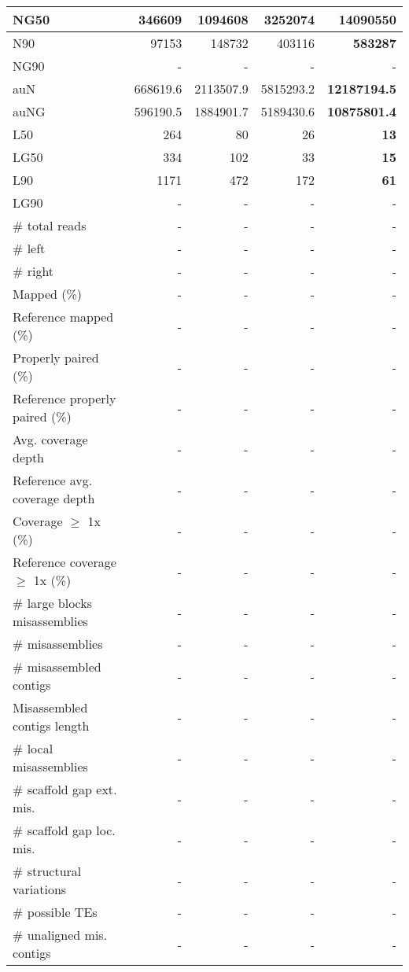 \documentclass[12pt,a4paper]{article}
\begin{document}
\begin{table}[ht]
\begin{center}
\begin{tabular}{|l*{4}{|r}|}
NG50 & 346609 & 1094608 & 3252074 & {\bf 14090550} \\ \hline
N90 & 97153 & 148732 & 403116 & {\bf 583287} \\ \hline
NG90 & - & - & - & - \\ \hline
auN & 668619.6 & 2113507.9 & 5815293.2 & {\bf 12187194.5} \\ \hline
auNG & 596190.5 & 1884901.7 & 5189430.6 & {\bf 10875801.4} \\ \hline
L50 & 264 & 80 & 26 & {\bf 13} \\ \hline
LG50 & 334 & 102 & 33 & {\bf 15} \\ \hline
L90 & 1171 & 472 & 172 & {\bf 61} \\ \hline
LG90 & - & - & - & - \\ \hline
\# total reads & - & - & - & - \\ \hline
\# left & - & - & - & - \\ \hline
\# right & - & - & - & - \\ \hline
Mapped (\%) & - & - & - & - \\ \hline
Reference mapped (\%) & - & - & - & - \\ \hline
Properly paired (\%) & - & - & - & - \\ \hline
Reference properly paired (\%) & - & - & - & - \\ \hline
Avg. coverage depth & - & - & - & - \\ \hline
Reference avg. coverage depth & - & - & - & - \\ \hline
Coverage $\geq$ 1x (\%) & - & - & - & - \\ \hline
Reference coverage $\geq$ 1x (\%) & - & - & - & - \\ \hline
\# large blocks misassemblies & - & - & - & - \\ \hline
\# misassemblies & - & - & - & - \\ \hline
\# misassembled contigs & - & - & - & - \\ \hline
Misassembled contigs length & - & - & - & - \\ \hline
\# local misassemblies & - & - & - & - \\ \hline
\# scaffold gap ext. mis. & - & - & - & - \\ \hline
\# scaffold gap loc. mis. & - & - & - & - \\ \hline
\# structural variations & - & - & - & - \\ \hline
\# possible TEs & - & - & - & - \\ \hline
\# unaligned mis. contigs & - & - & - & - \\ \hline

\end{tabular}
\end{center}
\end{table}
\end{document}
